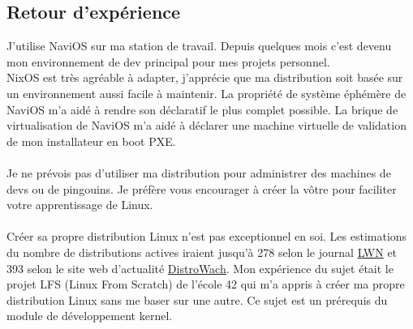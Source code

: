 \documentclass[a4paper,11pt]{article}
\begin{document}
\begin{blogmain}
\section{Retour d'expérience}
J'utilise NaviOS sur ma station de travail. Depuis quelques mois c'est devenu mon environnement de dev principal pour mes projets personnel. \\
NixOS est très agréable à adapter, j'apprécie que ma distribution soit basée sur un environnement aussi facile à maintenir.
La propriété de système éphémère de NaviOS m'a aidé à rendre son déclaratif le plus complet possible.
La brique de virtualisation de NaviOS m'a aidé à déclarer une machine virtuelle de validation de mon installateur en boot PXE. \\
\\
Je ne prévois pas d'utiliser ma distribution pour administrer des machines de devs ou de pingouins. Je préfère vous encourager à créer la vôtre pour faciliter votre apprentissage de Linux. \\
\\
Créer sa propre distribution Linux n'est pas exceptionnel en soi. Les estimations du nombre de distributions actives iraient jusqu'à 278 selon le journal \href{https://lwn.net/Distributions}{LWN} et 393 selon le site web d'actualité \href{https://distrowatch.com/weekly.php?issue=20251117}{DistroWach}.
Mon expérience du sujet était le projet LFS (Linux From Scratch) de l'école 42 qui m'a appris à créer ma propre distribution Linux sans me baser sur une autre. Ce sujet est un prérequis du module de développement kernel.



% 
\end{blogmain}
\end{document}
